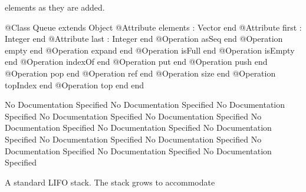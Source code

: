       elements as they are added.
\begin{Interface}
@Class Queue extends Object
  @Attribute elements : Vector end
  @Attribute first : Integer end
  @Attribute last : Integer end
  @Operation asSeq end
  @Operation empty end
  @Operation expand end
  @Operation isFull end
  @Operation isEmpty end
  @Operation indexOf end
  @Operation put end
  @Operation push end
  @Operation pop end
  @Operation ref end
  @Operation size end
  @Operation topIndex end
  @Operation top end
end
\end{Interface}
No Documentation Specified
No Documentation Specified
No Documentation Specified
No Documentation Specified
No Documentation Specified
No Documentation Specified
No Documentation Specified
No Documentation Specified
No Documentation Specified
No Documentation Specified
No Documentation Specified
No Documentation Specified
No Documentation Specified

      A standard LIFO stack. The stack grows to accommodate

